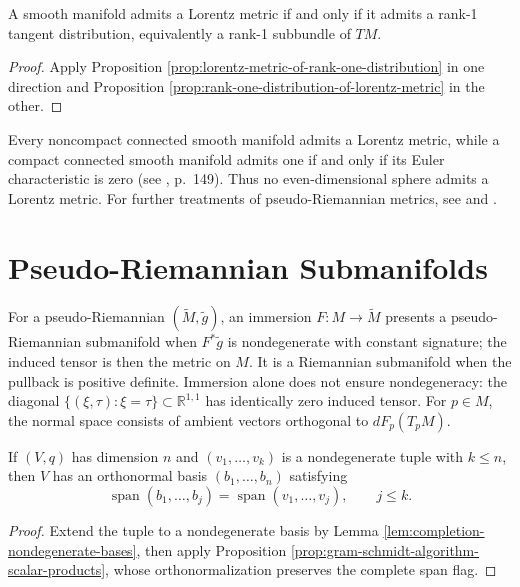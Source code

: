 \begin{theorem}
\label{thm:lorentz-metrics}
\leanok
{}
A smooth manifold admits a Lorentz metric if and only if it admits a rank-1
tangent distribution, equivalently a rank-1 subbundle of $TM$.
\end{theorem}

\begin{proof}
\leanok
{}
\sketch Apply Proposition \ref{prop:lorentz-metric-of-rank-one-distribution} in one
direction and Proposition \ref{prop:rank-one-distribution-of-lorentz-metric} in
the other.
\end{proof}

Every noncompact connected smooth manifold admits a Lorentz metric, while a compact connected smooth
manifold admits one if and only if its Euler characteristic is zero (see \cite{ON83}, p.~149). Thus no
even-dimensional sphere admits a Lorentz metric. For further treatments of pseudo-Riemannian metrics,
see \cite{ON83} and \cite{HE73}.
\section{Pseudo-Riemannian Submanifolds}

For a pseudo-Riemannian $(\widetilde M,\widetilde g)$, an immersion $F:M\to\widetilde M$ presents a pseudo-Riemannian submanifold when $F^*\widetilde g$ is nondegenerate with constant signature; the induced tensor is then the metric on $M$. It is a Riemannian submanifold when the pullback is positive definite. Immersion alone does not ensure nondegeneracy: the diagonal $\{(\xi,\tau):\xi=\tau\}\subset\mathbb R^{1,1}$ has identically zero induced tensor. For $p\in M$, the normal space consists of ambient vectors orthogonal to $dF_p(T_pM)$.

\begin{lemma}
\label{lem:adapted-orthonormal-basis}
\leanok
{}
If $(V,q)$ has dimension $n$ and $(v_1,\ldots,v_k)$ is a nondegenerate tuple with $k\le n$, then $V$ has an orthonormal basis $(b_1,\ldots,b_n)$ satisfying
\[
\operatorname{span}(b_1,\ldots,b_j)=\operatorname{span}(v_1,\ldots,v_j),\qquad j\le k.
\]
\end{lemma}
\begin{proof}
\leanok
{}
\sketch Extend the tuple to a nondegenerate basis by Lemma \ref{lem:completion-nondegenerate-bases}, then apply Proposition \ref{prop:gram-schmidt-algorithm-scalar-products}, whose orthonormalization preserves the complete span flag.
\end{proof}

